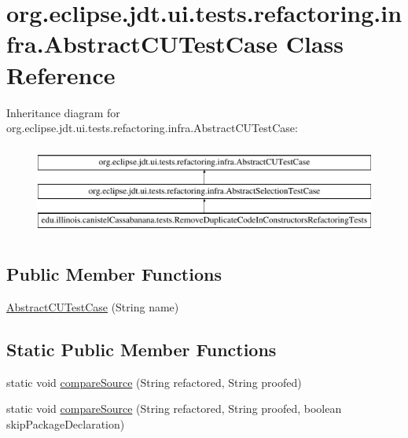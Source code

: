 \hypertarget{classorg_1_1eclipse_1_1jdt_1_1ui_1_1tests_1_1refactoring_1_1infra_1_1AbstractCUTestCase}{
\section{org.eclipse.jdt.ui.tests.refactoring.infra.AbstractCUTestCase Class Reference}
\label{classorg_1_1eclipse_1_1jdt_1_1ui_1_1tests_1_1refactoring_1_1infra_1_1AbstractCUTestCase}
}
Inheritance diagram for org.eclipse.jdt.ui.tests.refactoring.infra.AbstractCUTestCase:\begin{figure}[H]
\begin{center}
\leavevmode
\includegraphics[height=3.000000cm]{classorg_1_1eclipse_1_1jdt_1_1ui_1_1tests_1_1refactoring_1_1infra_1_1AbstractCUTestCase}
\end{center}
\end{figure}
\subsection*{Public Member Functions}
\begin{DoxyCompactItemize}
\item 
\hyperlink{classorg_1_1eclipse_1_1jdt_1_1ui_1_1tests_1_1refactoring_1_1infra_1_1AbstractCUTestCase_aa8d8ed3e9ce021b079b4ffa9a3c573c0}{AbstractCUTestCase} (String name)
\end{DoxyCompactItemize}
\subsection*{Static Public Member Functions}
\begin{DoxyCompactItemize}
\item 
static void \hyperlink{classorg_1_1eclipse_1_1jdt_1_1ui_1_1tests_1_1refactoring_1_1infra_1_1AbstractCUTestCase_a7af731217d1ff12f694de08a938dc798}{compareSource} (String refactored, String proofed)
\item 
static void \hyperlink{classorg_1_1eclipse_1_1jdt_1_1ui_1_1tests_1_1refactoring_1_1infra_1_1AbstractCUTestCase_a7e3b924599e026898032cffde644ad1c}{compareSource} (String refactored, String proofed, boolean skipPackageDeclaration)
\end{DoxyCompactItemize}
